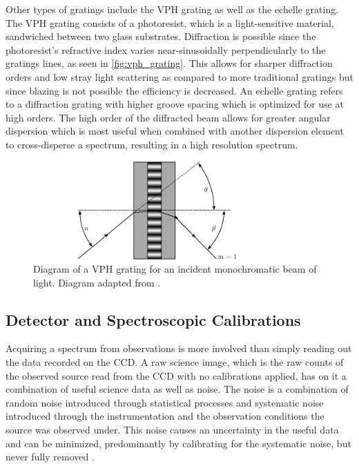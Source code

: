 Other types of gratings include the \gls{VPH} grating as well as the echelle grating. The \gls{VPH} grating consists of a photoresist, which is a light-sensitive material, sandwiched between two glass substrates. Diffraction is possible since the photoresist's refractive index varies near-sinusoidally perpendicularly to the gratings lines, as seen in \autoref{fig:vph_grating}. This allows for sharper diffraction orders and low stray light scattering as compared to more traditional gratings but since blazing is not possible the efficiency is decreased. An echelle grating refers to a diffraction grating with higher groove spacing which is optimized for use at high orders. The high order of the diffracted beam allows for greater angular dispersion which is most useful when combined with another dispersion element to cross-disperse a spectrum, resulting in a high resolution spectrum.

\begin{figure}[t]
    \centering
    \includegraphics[width = 10cm]{figures/2_vph_grating.pdf}
    \caption{Diagram of a \gls{VPH} grating for an incident monochromatic beam of light. Diagram adapted from \cite{BirneyObsAstro}.}
    \label{fig:vph_grating}
\end{figure}

\subsection{Detector and Spectroscopic Calibrations}\label{subsec:calibration}

Acquiring a spectrum from observations is more involved than simply reading out the data recorded on the \gls{CCD}. A raw science image, which is the raw counts of the observed source read from the \gls{CCD} with no calibrations applied, has on it a combination of useful science data as well as noise. The noise is a combination of random noise introduced through statistical processes and systematic noise introduced through the instrumentation and the observation conditions the source was observed under. This noise causes an uncertainty in the useful data and can be minimized, predominantly by calibrating for the systematic noise, but never fully removed \citep{CCDhandbook}.


